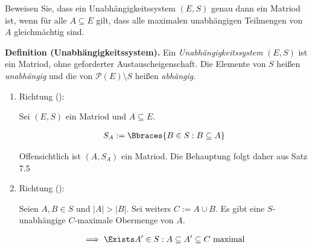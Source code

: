 
\begin{exercise}

Beweisen Sie, dass ein Unabhängigkeitssystem $(E, S)$ genau dann ein Matriod ist, wenn für alle $A \subseteq E$ gilt, dass alle maximalen unabhängigen Teilmengen von $A$ gleichmächtig sind.

\end{exercise}


\begin{solution}

\phantom{}


\textbf{Definition (Unabhängigkeitssystem).}
Ein \textit{Unabhängigkeitssystem} $(E, S)$ ist ein Matriod, ohne geforderter Austauscheigenschaft.
Die Elemente von $S$ heißen \textit{unabhängig} und die von $\mathcal{P}(E) \setminus S$ heißen \textit{abhängig}.

\begin{enumerate}[label = \arabic*.]

    \item Richtung (\Quote{$\Rightarrow$}):


    Sei $(E, S)$ ein Matriod und $A \subseteq E$.

    \begin{align*}
        S_A := \Bbraces{B \in S: B \subseteq A}
    \end{align*}

    Offensichtlich ist $(A, S_A)$ ein Matriod.
    Die Behauptung folgt daher aus Satz 7.5

    \item Richtung (\Quote{$\Leftarrow$}):
    
    Seien $A, B \in S$ und $|A| > |B|$.
    Sei weiters $C := A \cup B$.
    Es gibt eine $S$-unabhängige $C$-maximale Obermenge von $A$.

    \begin{align*}
        \implies
        \Exists A^\prime \in S:
        A \subseteq A^\prime \subseteq C ~\text{maximal}
    \end{align*}


\end{enumerate}
\end{solution}
